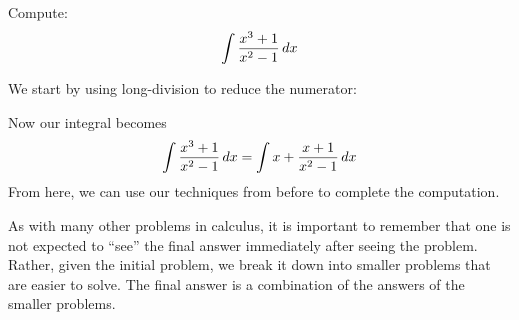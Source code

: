 \documentclass{ximera}
\begin{document}
\begin{example}
  Compute:
  \[
  \int \frac{x^3+1}{x^2-1} \mathop{}\!d x
  \]
  \begin{explanation}
    We start by using long-division to reduce the numerator:
    \begin{image}[2in]
    \end{image}
    Now our integral becomes
    \[
    \int \frac{x^3+1}{x^2-1}\mathop{}\!d x = \int x+ \frac{x+1}{x^2-1}\mathop{}\!d x
    \]
    From here, we can use our techniques from before to complete the
    computation.
  \end{explanation}
\end{example}
    


As with many other problems in calculus, it is important to remember
that one is not expected to ``see'' the final answer immediately after
seeing the problem. Rather, given the initial problem, we break it
down into smaller problems that are easier to solve. The final answer
is a combination of the answers of the smaller problems.
\end{document}
